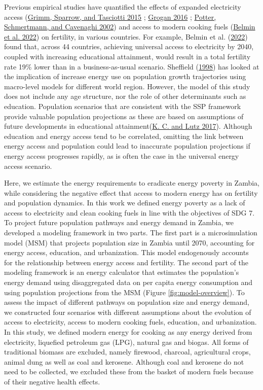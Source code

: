 \documentclass[
]{article}
\begin{document}
Previous empirical studies have quantified the effects of expanded electricity access (\protect\hyperlink{ref-grimm_does_2015}{Grimm, Sparrow, and Tasciotti 2015} ; \protect\hyperlink{ref-grogan_household_2016}{Grogan 2016} ; \protect\hyperlink{ref-potter_fertility_2002}{Potter, Schmertmann, and Cavenaghi 2002}) and access to modern cooking fuels (\protect\hyperlink{ref-belmin_fertility_2022}{Belmin et al. 2022}) on fertility, in various countries. For example, Belmin et al. (\protect\hyperlink{ref-belmin_fertility_2022}{2022}) found that, across 44 countries, achieving universal access to electricity by 2040, coupled with increasing educational attainment, would result in a total fertility rate 19\% lower than in a business-as-usual scenario. Sheffield (\protect\hyperlink{ref-sheffield_world_1998}{1998}) has looked at the implication of increase energy use on population growth trajectories using macro-level models for different world region. However, the model of this study does not include any age structure, nor the role of other determinants such as education. Population scenarios that are consistent with the SSP framework provide valuable population projections as these are based on assumptions of future developments in educational attainment(\protect\hyperlink{ref-kc_human_2017}{K. C. and Lutz 2017}). Although education and energy access tend to be correlated, omitting the link between energy access and population could lead to inaccurate population projections if energy access progresses rapidly, as is often the case in the universal energy access scenario.

Here, we estimate the energy requirements to eradicate energy poverty in Zambia, while considering the negative effect that access to modern energy has on fertility and population dynamics. In this work we defined energy poverty as a lack of access to electricity and clean cooking fuels in line with the objectives of SDG 7. To project future population pathways and energy demand in Zambia, we developed a modeling framework in two parts. The first part is a microsimulation model (MSM) that projects population size in Zambia until 2070, accounting for energy access, education, and urbanization. This model endogenously accounts for the relationship between energy access and fertility. The second part of the modeling framework is an energy calculator that estimates the population's energy demand using disaggregated data on per capita energy consumption and using population projections from the MSM (Figure \ref{fig:model-overview}). To assess the impact of different pathways on population size and energy demand, we constructed four scenarios with different assumptions about the evolution of access to electricity, access to modern cooking fuels, education, and urbanization. In this study, we defined modern energy for cooking as any energy derived from electricity, liquefied petroleum gas (LPG), natural gas and biogas. All forms of traditional biomass are excluded, namely firewood, charcoal, agricultural crops, animal dung as well as coal and kerosene. Although coal and kerosene do not need to be collected, we excluded these from the basket of modern fuels because of their negative health effects.
\end{document}
